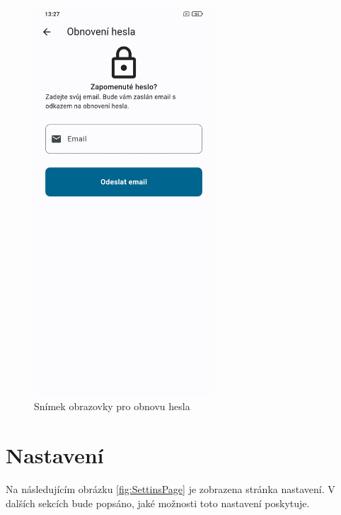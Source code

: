 \documentclass[czech, bc, kiv, he, iso690numb]{fasthesis}
\begin{document}
\begin{figure}[h!]
  \centering
  \includegraphics[width=0.6\textwidth]{img/BP-Runt/UserManual/PasswordReset.jpg}
  \caption{Snímek obrazovky pro obnovu hesla}
  \label{fig:ResetPasswordScreen}
\end{figure}

\section{Nastavení} \label{manual:settings}

Na následujícím obrázku \ref{fig:SettinsPage} je zobrazena stránka nastavení. V dalších sekcích bude popsáno, jaké možnosti toto nastavení poskytuje.
\end{document}
